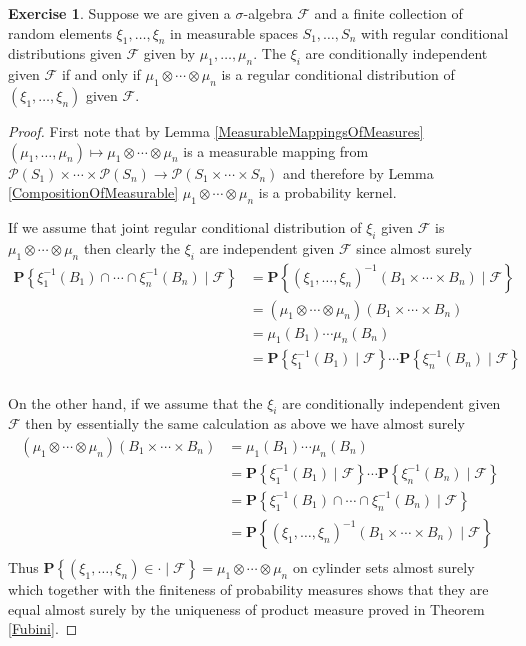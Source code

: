 \documentclass{amsbook}
\theoremstyle{definition}
\newtheorem{xca}{Exercise}
\theoremstyle{remark}
\newcommand{\cprobability}[2]{\textbf{P} \left \{#2 \mid #1 \right \}}
\begin{document}
\begin{xca}\label{ConditionalIndependenceProductMeasures}Suppose we
  are given a $\sigma$-algebra $\mathcal{F}$ and a finite collection of
  random elements $\xi_1, \dots, \xi_n$ in measurable spaces
  $S_1, \dots, S_n$ with regular conditional distributions given
  $\mathcal{F}$ given by $\mu_1, \dots, \mu_n$.  The
  $\xi_i$ are conditionally independent given $\mathcal{F}$ if and only if  $\mu_1 \otimes
  \cdots \otimes \mu_n$ is a regular
  conditional distribution of $(\xi_1,  \dots, \xi_n)$ given $\mathcal{F}$.
\end{xca}
\begin{proof}
First note that by Lemma \ref{MeasurableMappingsOfMeasures} $(\mu_1, \dotsc, \mu_n) \mapsto \mu_1 \otimes \cdots \otimes \mu_n$ 
is a measurable mapping from $\mathcal{P}(S_1) \times \cdots \times \mathcal{P}(S_n) \to \mathcal{P}(S_1 \times \cdots \times S_n)$ 
and therefore by Lemma \ref{CompositionOfMeasurable} $\mu_1 \otimes \cdots \otimes \mu_n$ is a probability kernel.

If we assume that joint regular conditional distribution of $\xi_i$ given $\mathcal{F}$ is $\mu_1 \otimes
  \cdots \otimes \mu_n$ then clearly the $\xi_i$ are independent
  given $\mathcal{F}$ since almost surely
\begin{align*}
\cprobability{\mathcal{F}}{\xi_1^{-1}(B_1) \cap \cdots \cap \xi_n^{-1}(B_n)} &=
\cprobability{\mathcal{F}}{(\xi_1, \dots, \xi_n)^{-1}(B_1 \times \cdots \times B_n)}  \\
&= (\mu_1 \otimes \cdots \otimes \mu_n)(B_1 \times \cdots \times B_n) \\
&= \mu_1(B_1) \cdots \mu_n(B_n) \\
&=\cprobability{\mathcal{F}}{\xi_1^{-1}(B_1)} \cdots \cprobability{\mathcal{F}}{\xi_n^{-1}(B_n)} \\
\end{align*}

On the other hand, if we assume that the $\xi_i$ are conditionally independent given $\mathcal{F}$ then
by essentially the same calculation as above we have almost surely
\begin{align*}
 (\mu_1 \otimes \cdots \otimes \mu_n)(B_1 \times \cdots \times B_n) 
&=\mu_1(B_1) \cdots \mu_n(B_n) \\
&=\cprobability{\mathcal{F}}{\xi_1^{-1}(B_1)} \cdots \cprobability{\mathcal{F}}{\xi_n^{-1}(B_n)} \\
&=\cprobability{\mathcal{F}}{\xi_1^{-1}(B_1) \cap \cdots \cap \xi_n^{-1}(B_n)} \\
&=\cprobability{\mathcal{F}}{(\xi_1, \dots, \xi_n)^{-1}(B_1 \times \cdots \times B_n)}  \\
\end{align*}
Thus $\cprobability{\mathcal{F}}{(\xi_1, \dots, \xi_n) \in \cdot} =
\mu_1 \otimes \cdots \otimes \mu_n$ on cylinder sets almost surely  which together
with the finiteness of probability measures shows that
they are equal almost surely by the uniqueness of product measure proved
in Theorem \ref{Fubini}.  
\end{proof}
\end{document}

